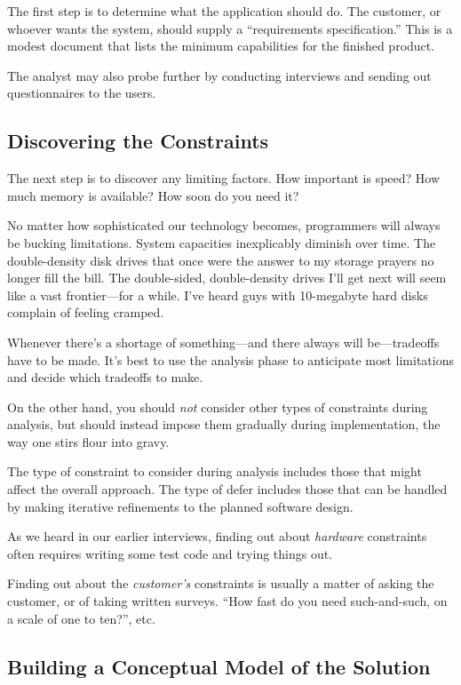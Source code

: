 The first step is to determine what the application should
do. The customer, or whoever wants the system, should supply a
``requirements specification.'' This is a modest document that lists
the minimum capabilities for the finished product.

The analyst may also probe further by conducting interviews and
sending out questionnaires to the users.

\subsection{Discovering the Constraints}

The next step is to discover any limiting factors. How important is
speed? How much memory is available? How soon do you need it?

No matter how sophisticated our technology becomes, programmers will
always be bucking limitations. System capacities inexplicably
diminish over time. The double-density disk drives that once were the
answer to my storage prayers no longer fill the bill. The
double-sided, double-density drives I'll get next will seem like a
vast frontier---for a while. I've heard guys with 10-megabyte hard
disks complain of feeling cramped.

Whenever there's a shortage of something---and there always will
be---tradeoffs have to be made. It's best to use the analysis phase to
anticipate most limitations and decide which tradeoffs to make.

On the other hand, you should \emph{not} consider other types of
constraints during analysis, but should instead impose them gradually
during implementation, the way one stirs flour into gravy.

The type of constraint to consider during analysis includes those that
might affect the overall approach. The type of defer includes those
that can be handled by making iterative refinements to the planned
software design.

As we heard in our earlier interviews, finding out about \emph{hardware}
constraints often requires writing some test code and trying things out.

Finding out about the \emph{customer's} constraints is usually a
matter of asking the customer, or of taking written surveys. ``How
fast do you need such-and-such, on a scale of one to ten?'', etc.

\subsection{Building a Conceptual Model of the Solution}


